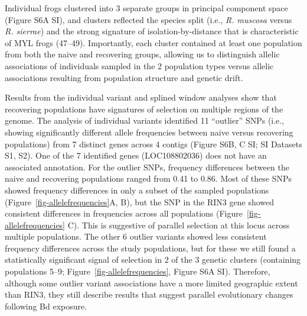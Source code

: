 \documentclass[9pt,twocolumn,twoside,lineno]{pnas-new}
\begin{document}
Individual frogs clustered into 3 separate groups in principal component
space (Figure S6A SI), and clusters reflected
the species split (i.e., \emph{R. muscosa} versus \emph{R. sierrae}) and
the strong signature of isolation-by-distance that is characteristic of
MYL frogs (47--49). Importantly, each cluster contained at least one
population from both the naive and recovering groups, allowing us to
distinguish allelic associations of individuals sampled in the 2
population types versus allelic associations resulting from population
structure and genetic drift.

Results from the individual variant and splined window analyses show
that recovering populations have signatures of selection on multiple
regions of the genome. The analysis of individual variants identified 11
``outlier'' SNPs (i.e., showing significantly different allele
frequencies between naive versus recovering populations) from 7 distinct
genes across 4 contigs (Figure S6B, C SI; SI
Datasets S1, S2). One of the 7 identified genes (LOC108802036) does not
have an associated annotation. For the outlier SNPs, frequency
differences between the naive and recovering populations ranged from
0.41 to 0.86. Most of these SNPs showed frequency differences in only a
subset of the sampled populations (Figure~\ref{fig-allelefrequencies}A,
B), but the SNP in the RIN3 gene showed consistent differences in
frequencies across all populations (Figure~\ref{fig-allelefrequencies}
C). This is suggestive of parallel selection at this locus across
multiple populations. The other 6 outlier variants showed less
consistent frequency differences across the study populations, but for
these we still found a statistically significant signal of selection in
2 of the 3 genetic clusters (containing populations 5--9;
Figure~\ref{fig-allelefrequencies}, Figure S6A
SI). Therefore, although some outlier variant associations have a more
limited geographic extent than RIN3, they still describe results that
suggest parallel evolutionary changes following Bd exposure.
\end{document}
